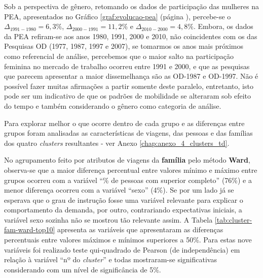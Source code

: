 Sob a perspectiva de gênero, retomando os dados de participação das mulheres na PEA, apresentados no Gráfico \ref{graf:evolucao-pea} (página \pageref{graf:evolucao-pea}), percebe-se o $\Delta_{1991-1980} = 6,3\%$, $\Delta_{2000-1991} = 11,2\%$ e $\Delta_{2010-2000} = 4,8\%$. 
Embora, os dados da PEA refiram-se aos anos 1980, 1991, 2000 e 2010, não coincidentes com os das Pesquisas OD (1977, 1987, 1997 e 2007), se tomarmos os anos mais próximos como referencial de análise, percebemos que o maior salto na participação feminina no mercado de trabalho ocorreu entre 1991 e 2000, e que as pesquisas que parecem apresentar a maior dissemelhança são as OD-1987 e OD-1997. 
Não é possível fazer muitas afirmações a partir somente deste paralelo, entretanto, isto pode ser um indicativo de que os padrões de mobilidade se alteraram sob efeito do tempo e também considerando o gênero como categoria de análise.
 
Para explorar melhor o que ocorre dentro de cada grupo e as diferenças entre grupos foram analisadas as características de viagens, das pessoas e das famílias dos quatro \textit{clusters} resultantes - ver Anexo \ref{chap:anexo_4_clusters_td}.

No agrupamento feito por atributos de viagens da \textbf{família} pelo método \textbf{Ward}, observa-se que a maior diferença percentual entre valores mínimo e máximo entre grupos ocorreu com a variável ``\% de pessoas com superior completo'' (76\%) e a menor diferença ocorreu com a variável ``sexo'' (4\%).
Se por um lado já se esperava que o grau de instrução fosse uma variável relevante para explicar o comportamento da demanda, por outro, contrariando expectativas iniciais, a variável sexo sozinha não se mostrou tão relevante assim.
A Tabela \ref{tab:cluster-fam-ward-top10} apresenta as variáveis que apresentaram as diferenças percentuais entre valores máximos e mínimos superiores a 50\%.
Para estas nove variáveis foi realizado teste qui-quadrado de Pearson (de independência) em relação à variável ``nº do \textit{cluster}'' e todas mostraram-se significativas considerando com um nível de significância de 5\%. 

